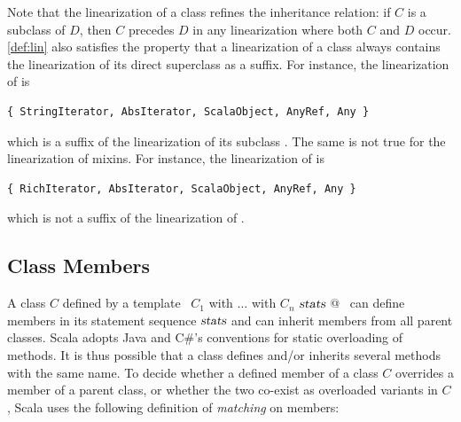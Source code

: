 Note that the linearization of a class refines the inheritance
relation: if $C$ is a subclass of $D$, then $C$ precedes $D$ in any
linearization where both $C$ and $D$ occur.
\ref{def:lin} also satisfies the property that a linearization
of a class always contains the linearization of its direct superclass
as a suffix.  For instance, the linearization of
\lstinline@StringIterator@ is
\begin{lstlisting}
{ StringIterator, AbsIterator, ScalaObject, AnyRef, Any }
\end{lstlisting}
which is a suffix of the linearization of its subclass \lstinline@Iter@.
The same is not true for the linearization of mixins.
For instance, the linearization of \lstinline@RichIterator@ is
\begin{lstlisting}
{ RichIterator, AbsIterator, ScalaObject, AnyRef, Any }
\end{lstlisting}
which is not a suffix of the linearization of \lstinline@Iter@.


\subsection{Class Members}
\label{sec:members}

A class $C$ defined by a template 
~\lstinline@$C_1$ with $\ldots$ with $C_n$ { $\mbox{\sl stats}$ }@~ 
can define members in its statement sequence
$\mbox{\sl stats}$ and can inherit members from all parent classes.  Scala
adopts Java and C\#'s conventions for static overloading of
methods. It is thus possible that a class defines and/or inherits
several methods with the same name.  To decide whether a defined
member of a class $C$ overrides a member of a parent class, or whether
the two co-exist as overloaded variants in $C$, Scala uses the
following definition of {\em matching} on members:

